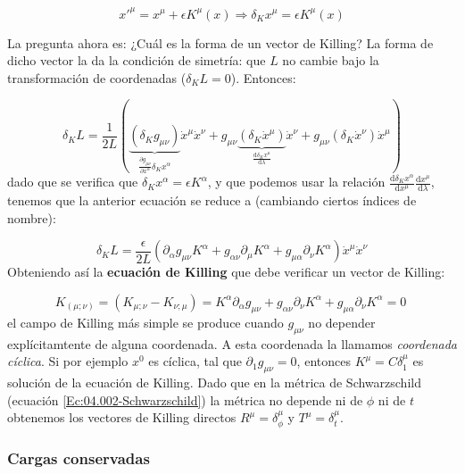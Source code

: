 \documentclass[12pt,a4paper]{book}
\numberwithin{equation}{section}
\numberwithin{figure}{section}
\newcommand{\parentesis}[1]{\left( #1  \right)}
\newcommand{\parciales}[2]{\frac{\partial #1}{\partial #2}}
\newcommand{\D}{\mathrm{d}}
\newcommand{\derivadas}[2]{\frac{\D #1}{\D #2}}
\begin{document}
\begin{equation}
x'^\mu = x^\mu + \epsilon K^\mu (x) \Rightarrow \delta_K x^\mu = \epsilon K^\mu (x)
\end{equation}

La pregunta ahora es: ¿Cuál es la forma de un vector de Killing? La forma de dicho vector la da la condición de simetría: que $L$ no cambie bajo la transformación de coordenadas ($\delta_K L=0$). Entonces:

\begin{equation}
\delta_K L = \frac{1}{2L} \parentesis{ \underbrace{(\delta_K g_{\mu \nu})}_{\parciales{g_{\mu \nu}}{x^\alpha}\delta_K x^\alpha} \dot{x}^\mu \dot{x}^\nu + g_{\mu \nu} \underbrace{(\delta_K \dot{x}^\mu)}_{\derivadas{\delta_K x^\mu}{\lambda}} \dot{x}^\nu  + g_{\mu \nu} (\delta_K \dot{x}^\nu) \dot{x}^\mu  } 
\end{equation}
dado que se verifica que $\delta_K x^\alpha = \epsilon K^\alpha$, y que podemos usar la relación $\derivadas{\delta_K x^\alpha}{x^\mu}\derivadas{x^\mu}{\lambda}$, tenemos que la anterior ecuación se reduce a (cambiando ciertos índices de nombre): 

\begin{equation}
\delta_K L = \frac{\epsilon}{2L} \parentesis{\partial_\alpha g_{\mu \nu} K^\alpha + g_{\alpha \nu} \partial_\mu K^\alpha + g_{\mu \alpha} \partial_\nu K^\alpha} \dot{x}^\mu \dot{x}^\nu
\end{equation}
Obteniendo así la \textbf{ecuación de Killing} que debe verificar un vector de Killing:

\begin{equation}
K_{(\mu ;\nu)} = \parentesis{K_{\mu;\nu} - K_{\nu;\mu}} = K^\alpha \partial_\alpha g_{\mu \nu} + g_{\alpha \nu} \partial_\nu K^\alpha + g_{\mu \alpha} \partial_\nu K^\alpha = 0 \ \label{Ec:04.010-Killing}
\end{equation}
el campo de Killing más simple se produce cuando $g_{\mu \nu}$ no depender explícitamtente de alguna coordenada. A esta coordenada la llamamos \textit{coordenada cíclica}. Si por ejemplo $x^0$ es cíclica, tal que $\partial_1 g_{\mu \nu}= 0$, entonces $K^\mu = C \delta ^\mu_1$ es solución de la ecuación de Killing.  Dado que en la métrica de Schwarzschild (ecuación \ref{Ec:04.002-Schwarzschild}) la métrica no depende ni de $\phi$ ni de $t$ obtenemos los vectores de Killing directos  $R^\mu = \delta^\mu_\phi$ y  $T^\mu = \delta^\mu_t$.




\subsubsection{Cargas conservadas}
\end{document}

